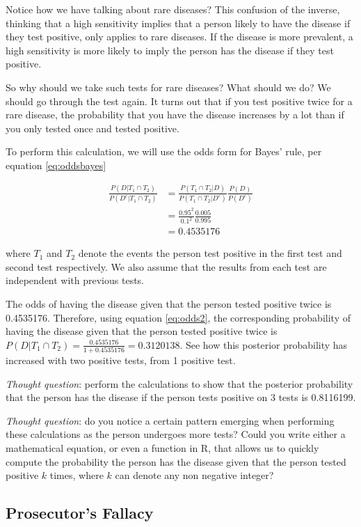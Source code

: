 \documentclass[
]{book}
\begin{document}
Notice how we have talking about rare diseases? This confusion of the inverse, thinking that a high sensitivity implies that a person likely to have the disease if they test positive, only applies to rare diseases. If the disease is more prevalent, a high sensitivity is more likely to imply the person has the disease if they test positive.

So why should we take such tests for rare diseases? What should we do? We should go through the test again. It turns out that if you test positive twice for a rare disease, the probability that you have the disease increases by a lot than if you only tested once and tested positive.

To perform this calculation, we will use the odds form for Bayes' rule, per equation \eqref{eq:oddsbayes}

\[
\begin{split}
\frac{P(D|T_1 \cap T_2)}{P(D^c|T_1 \cap T_2)} &= \frac{P(T_1 \cap T_2 | D)}{P(T_1 \cap T_2 | D^c)} \frac{P(D)}{P(D^c)}\\
 &= \frac{0.95^2}{0.1^2} \frac{0.005}{0.995} \\
&= 0.4535176
\end{split}
\]

where \(T_1\) and \(T_2\) denote the events the person test positive in the first test and second test respectively. We also assume that the results from each test are independent with previous tests.

The odds of having the disease given that the person tested positive twice is 0.4535176. Therefore, using equation \eqref{eq:odds2}, the corresponding probability of having the disease given that the person tested positive twice is \(P(D|T_1 \cap T_2) = \frac{0.4535176}{1+0.4535176} = 0.3120138\). See how this posterior probability has increased with two positive tests, from 1 positive test.

\emph{Thought question}: perform the calculations to show that the posterior probability that the person has the disease if the person tests positive on 3 tests is 0.8116199.

\emph{Thought question}: do you notice a certain pattern emerging when performing these calculations as the person undergoes more tests? Could you write either a mathematical equation, or even a function in R, that allows us to quickly compute the probability the person has the disease given that the person tested positive \(k\) times, where \(k\) can denote any non negative integer?

\hypertarget{prosecutors-fallacy}{%
\subsection{Prosecutor's Fallacy}\label{prosecutors-fallacy}}
\end{document}
